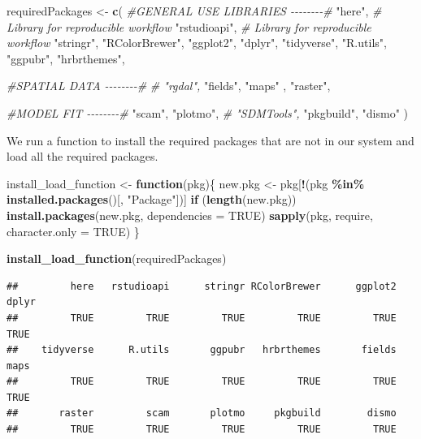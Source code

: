 \documentclass[
]{book}
\newenvironment{Shaded}{\begin{snugshade}}{\end{snugshade}}
\newcommand{\AttributeTok}[1]{\textcolor[rgb]{0.13,0.29,0.53}{#1}}
\newcommand{\CommentTok}[1]{\textcolor[rgb]{0.56,0.35,0.01}{\textit{#1}}}
\newcommand{\ConstantTok}[1]{\textcolor[rgb]{0.56,0.35,0.01}{#1}}
\newcommand{\ControlFlowTok}[1]{\textcolor[rgb]{0.13,0.29,0.53}{\textbf{#1}}}
\newcommand{\FunctionTok}[1]{\textcolor[rgb]{0.13,0.29,0.53}{\textbf{#1}}}
\newcommand{\NormalTok}[1]{#1}
\newcommand{\OtherTok}[1]{\textcolor[rgb]{0.56,0.35,0.01}{#1}}
\newcommand{\SpecialCharTok}[1]{\textcolor[rgb]{0.81,0.36,0.00}{\textbf{#1}}}
\newcommand{\StringTok}[1]{\textcolor[rgb]{0.31,0.60,0.02}{#1}}
\begin{document}
\begin{Shaded}
\begin{Highlighting}[]
\NormalTok{requiredPackages }\OtherTok{\textless{}{-}} \FunctionTok{c}\NormalTok{(}
  \CommentTok{\#GENERAL USE LIBRARIES {-}{-}{-}{-}{-}{-}{-}{-}\#}
  \StringTok{"here"}\NormalTok{, }\CommentTok{\# Library for reproducible workflow}
  \StringTok{"rstudioapi"}\NormalTok{,  }\CommentTok{\# Library for reproducible workflow}
  \StringTok{"stringr"}\NormalTok{,}
  \StringTok{"RColorBrewer"}\NormalTok{,  }
  \StringTok{"ggplot2"}\NormalTok{,}
  \StringTok{"dplyr"}\NormalTok{,}
  \StringTok{"tidyverse"}\NormalTok{,}
  \StringTok{"R.utils"}\NormalTok{,}
  \StringTok{"ggpubr"}\NormalTok{,}
  \StringTok{"hrbrthemes"}\NormalTok{,}
  
  \CommentTok{\#SPATIAL DATA {-}{-}{-}{-}{-}{-}{-}{-}\#}
  \CommentTok{\# "rgdal",}
  \StringTok{"fields"}\NormalTok{,}
  \StringTok{"maps"}\NormalTok{ ,}
  \StringTok{"raster"}\NormalTok{,}

  \CommentTok{\#MODEL FIT {-}{-}{-}{-}{-}{-}{-}{-}\#}
  \StringTok{"scam"}\NormalTok{,}
  \StringTok{"plotmo"}\NormalTok{,}
  \CommentTok{\# "SDMTools",}
  \StringTok{"pkgbuild"}\NormalTok{,}
  \StringTok{"dismo"}
\NormalTok{  )}
\end{Highlighting}
\end{Shaded}

We run a function to install the required packages that are not in our system and load all the required packages.

\begin{Shaded}
\begin{Highlighting}[]
\NormalTok{install\_load\_function }\OtherTok{\textless{}{-}} \ControlFlowTok{function}\NormalTok{(pkg)\{}
\NormalTok{  new.pkg }\OtherTok{\textless{}{-}}\NormalTok{ pkg[}\SpecialCharTok{!}\NormalTok{(pkg }\SpecialCharTok{\%in\%} \FunctionTok{installed.packages}\NormalTok{()[, }\StringTok{"Package"}\NormalTok{])]}
  \ControlFlowTok{if}\NormalTok{ (}\FunctionTok{length}\NormalTok{(new.pkg))}
    \FunctionTok{install.packages}\NormalTok{(new.pkg, }\AttributeTok{dependencies =} \ConstantTok{TRUE}\NormalTok{)}
  \FunctionTok{sapply}\NormalTok{(pkg, require, }\AttributeTok{character.only =} \ConstantTok{TRUE}\NormalTok{)}
\NormalTok{\}}

\FunctionTok{install\_load\_function}\NormalTok{(requiredPackages)}
\end{Highlighting}
\end{Shaded}

\begin{verbatim}
##         here   rstudioapi      stringr RColorBrewer      ggplot2        dplyr 
##         TRUE         TRUE         TRUE         TRUE         TRUE         TRUE 
##    tidyverse      R.utils       ggpubr   hrbrthemes       fields         maps 
##         TRUE         TRUE         TRUE         TRUE         TRUE         TRUE 
##       raster         scam       plotmo     pkgbuild        dismo 
##         TRUE         TRUE         TRUE         TRUE         TRUE
\end{verbatim}
\end{document}
